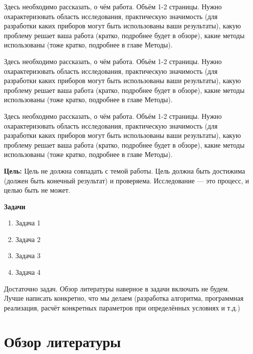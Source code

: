 \documentclass[a4paper,14pt]{extarticle}
\begin{document}


\tableofcontents
\pagebreak


Здесь необходимо рассказать, о чём работа. Объём 1-2 страницы. Нужно охарактеризовать область исследования, практическую значимость (для разработки каких приборов могут быть использованы ваши результаты), какую проблему решает ваша работа (кратко, подробнее будет в обзоре), какие методы использованы (тоже кратко, подробнее в главе Методы).

Здесь необходимо рассказать, о чём работа. Объём 1-2 страницы. Нужно охарактеризовать область исследования, практическую значимость (для разработки каких приборов могут быть использованы ваши результаты), какую проблему решает ваша работа (кратко, подробнее будет в обзоре), какие методы использованы (тоже кратко, подробнее в главе Методы).

Здесь необходимо рассказать, о чём работа. Объём 1-2 страницы. Нужно охарактеризовать область исследования, практическую значимость (для разработки каких приборов могут быть использованы ваши результаты), какую проблему решает ваша работа (кратко, подробнее будет в обзоре), какие методы использованы (тоже кратко, подробнее в главе Методы).

\label{Tasks}

\textbf{Цель:} Цель не должна совпадать с темой работы. Цель должна быть достижима (должен быть конечный результат) и проверяема. Исследование --- это процесс, и целью быть не может.

\textbf{Задачи}
\begin{enumerate}
    \item Задача 1
    \item Задача 2
    \item Задача 3
    \item Задача 4
\end{enumerate}

Достаточно задач. Обзор литературы наверное в задачи включать не будем. Лучше написать конкретно, что мы делаем (разработка алгоритма, программная реализация, расчёт конкретных параметров при определённых условиях и т.д.)

\pagebreak
\section{Обзор литературы}
\label{Review}
\end{document}
